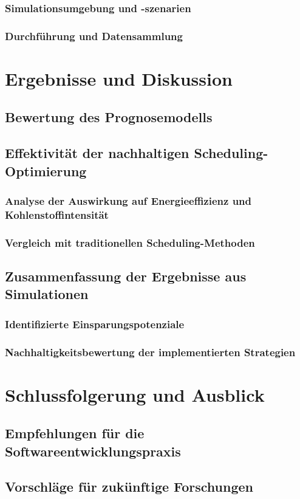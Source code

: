 \subsection{Simulationsumgebung und -szenarien}
\subsection{Durchführung und Datensammlung}

\chapter{Ergebnisse und Diskussion}
\section{Bewertung des Prognosemodells}
\section{Effektivität der nachhaltigen Scheduling-Optimierung}
\subsection{Analyse der Auswirkung auf Energieeffizienz und Kohlenstoffintensität}
\subsection{Vergleich mit traditionellen Scheduling-Methoden}
\section{Zusammenfassung der Ergebnisse aus Simulationen}
\subsection{Identifizierte Einsparungspotenziale}
\subsection{Nachhaltigkeitsbewertung der implementierten Strategien}

\chapter{Schlussfolgerung und Ausblick}
\section{Empfehlungen für die Softwareentwicklungspraxis}
\section{Vorschläge für zukünftige Forschungen}
